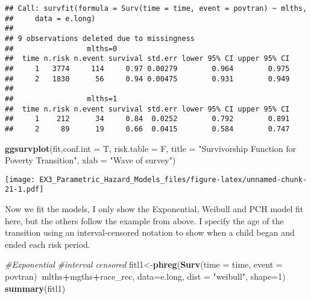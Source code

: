 \documentclass[
]{article}
\newenvironment{Shaded}{\begin{snugshade}}{\end{snugshade}}
\newcommand{\CommentTok}[1]{\textcolor[rgb]{0.56,0.35,0.01}{\textit{#1}}}
\newcommand{\DataTypeTok}[1]{\textcolor[rgb]{0.13,0.29,0.53}{#1}}
\newcommand{\DecValTok}[1]{\textcolor[rgb]{0.00,0.00,0.81}{#1}}
\newcommand{\KeywordTok}[1]{\textcolor[rgb]{0.13,0.29,0.53}{\textbf{#1}}}
\newcommand{\NormalTok}[1]{#1}
\newcommand{\OperatorTok}[1]{\textcolor[rgb]{0.81,0.36,0.00}{\textbf{#1}}}
\newcommand{\StringTok}[1]{\textcolor[rgb]{0.31,0.60,0.02}{#1}}
\begin{document}
\begin{verbatim}
## Call: survfit(formula = Surv(time = time, event = povtran) ~ mlths, 
##     data = e.long)
## 
## 9 observations deleted due to missingness 
##                 mlths=0 
##  time n.risk n.event survival std.err lower 95% CI upper 95% CI
##     1   3774     114     0.97 0.00279        0.964        0.975
##     2   1830      56     0.94 0.00475        0.931        0.949
## 
##                 mlths=1 
##  time n.risk n.event survival std.err lower 95% CI upper 95% CI
##     1    212      34     0.84  0.0252        0.792        0.891
##     2     89      19     0.66  0.0415        0.584        0.747
\end{verbatim}

\begin{Shaded}
\begin{Highlighting}[]
\KeywordTok{ggsurvplot}\NormalTok{(fit,}\DataTypeTok{conf.int =}\NormalTok{ T, }\DataTypeTok{risk.table =}\NormalTok{ F, }\DataTypeTok{title =} \StringTok{"Survivorship Function for Poverty Transition"}\NormalTok{, }\DataTypeTok{xlab =} \StringTok{"Wave of survey"}\NormalTok{)}
\end{Highlighting}
\end{Shaded}

\texttt{[image: EX3\_Parametric\_Hazard\_Models\_files/figure-latex/unnamed-chunk-21-1.pdf]}

Now we fit the models, I only show the Exponential, Weibull and PCH
model fit here, but the others follow the example from above. I specify
the age of the transition using an interval-censored notation to show
when a child began and ended each risk period.

\begin{Shaded}
\begin{Highlighting}[]
\CommentTok{#Exponential}
\CommentTok{#interval censored}
\NormalTok{fitl1<-}\KeywordTok{phreg}\NormalTok{(}\KeywordTok{Surv}\NormalTok{(}\DataTypeTok{time =}\NormalTok{ time, }\DataTypeTok{event =}\NormalTok{ povtran)}\OperatorTok{~}\NormalTok{mlths}\OperatorTok{+}\NormalTok{mgths}\OperatorTok{+}\NormalTok{race_rec, }\DataTypeTok{data=}\NormalTok{e.long, }\DataTypeTok{dist =} \StringTok{"weibull"}\NormalTok{, }\DataTypeTok{shape=}\DecValTok{1}\NormalTok{)}
\KeywordTok{summary}\NormalTok{(fitl1)  }
\end{Highlighting}
\end{Shaded}
\end{document}
